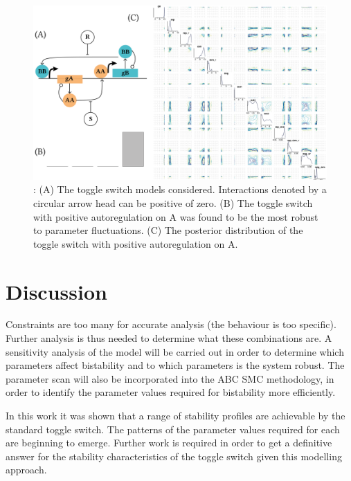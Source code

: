 \begin{figure}[htbp]
	\begin{center}
\includegraphics[scale=0.75]{../../chapters/chapterABCSysBio/images/model_sel_res.png}
\caption[LoF caption]{\label{fig:model_sel_res}: (A) The toggle switch models considered. Interactions denoted by a circular arrow head can be positive of zero. (B) The toggle switch with positive autoregulation on A was found to be the most robust to parameter fluctuations. (C) The posterior distribution of the toggle switch with positive autoregulation on A.}
\end{center}
\end{figure}
\clearpage

\section{Discussion}

Constraints are too many for accurate analysis (the behaviour is too specific).
Further analysis is thus needed to determine what these combinations are. A sensitivity analysis of the model will be carried out in order to determine which parameters affect bistability and to which parameters is the system robust. The parameter scan will also be incorporated into the ABC SMC methodology, in order to identify the parameter values required for bistability more efficiently.             

In this work it was shown that a range of stability profiles are achievable by the standard toggle switch. The patterns of the parameter values required for each are beginning to emerge. Further work is required in order to get a definitive answer for the stability characteristics of the toggle switch given this modelling approach.


